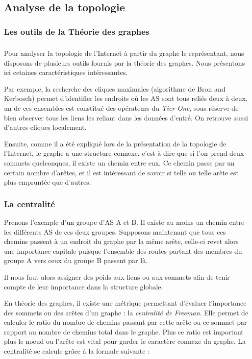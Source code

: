

%

\subsection{Analyse de la topologie}

\subsubsection{Les outils de la Th\'eorie des graphes}
\subparagraph{}
Pour analyser la topologie de l'Internet \`a partir du graphe le repr\'esentant, nous disposons de plusieurs outils fournis par la th\'eorie des graphes. Nous pr\'esentons ici cetaines caract\'eristiques int\'eressantes.

Par exemple, la recherche des cliques maximales (algorithme de Bron and Kerbosch) permet d'identifier les endroits o\`u les AS sont tous reli\'es deux \`a deux, un de ces ensembles est constitu\'e des op\'erateurs du \textit{Tier One}, sous r\'eserve de bien observer tous les liens les reliant dans les donn\'ees d'entr\'e. On retrouve aussi d'autres cliques localement.
\par
Ensuite, comme il a été expliqu\'e lors de la pr\'esentation de la topologie de l'Internet, le graphe a une structure connexe, c'est-\`a-dire que si l'on prend deux sommets quelconques, il existe un chemin entre eux.
Ce chemin passe par un certain nombre d'ar\^etes, et il est int\'eressant de savoir si telle ou telle ar\^ete est plus emprunt\'ee que d'autres.

\subsubsection{La centralit\'e}

\par
Prenons l'exemple d'un groupe d'AS A et B. Il existe au moins un chemin entre les diff\'erents AS de ces deux groupes. Supposons maintenant que tous ces chemins passent \`a un endroit du graphe par la m\^eme ar\^ete, celle-ci revet alors une importance capitale puisque l'ensemble des routes partant des membres du groupe A vers ceux du groupe B passent par l\`a.
\par
Il nous faut alors assigner des poids aux liens ou aux sommets afin de tenir compte de leur importance dans la structure globale.

\par
En th\'eorie des graphes, il existe une m\'etrique permettant d'\'evaluer l'importance des sommets ou des ar\^etes d'un graphe : la \textit{centralit\'e de Freeman}. Elle permet de calculer le ratio du nombre de chemins passant par cette ar\^ete ou ce sommet par rapport au nombre de chemins total dans le graphe. Plus ce ratio est important plus le noeud ou l'ar\^ete est vital pour garder le caract\`ere connexe du graphe. La centralit\'e se calcule gr\^ace \`a la formule suivante :


